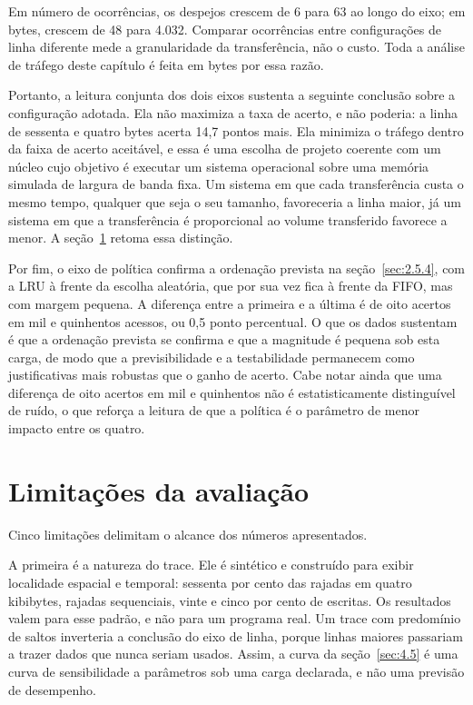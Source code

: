 Em número de ocorrências, os despejos crescem de 6 para 63 ao longo do eixo; em bytes, crescem de 48 para 4.032. Comparar ocorrências entre configurações de linha diferente mede a granularidade da transferência, não o custo. Toda a análise de tráfego deste capítulo é feita em bytes por essa razão.

Portanto, a leitura conjunta dos dois eixos sustenta a seguinte conclusão sobre a configuração adotada. Ela não maximiza a taxa de acerto, e não poderia: a linha de sessenta e quatro bytes acerta 14,7 pontos mais. Ela minimiza o tráfego dentro da faixa de acerto aceitável, e essa é uma escolha de projeto coerente com um núcleo cujo objetivo é executar um sistema operacional sobre uma memória simulada de largura de banda fixa. Um sistema em que cada transferência custa o mesmo tempo, qualquer que seja o seu tamanho, favoreceria a linha maior, já um sistema em que a transferência é proporcional ao volume transferido favorece a menor. A seção~\ref{sec:4.7} retoma essa distinção.

Por fim, o eixo de política confirma a ordenação prevista na seção~\ref{sec:2.5.4}, com a LRU à frente da escolha aleatória, que por sua vez fica à frente da FIFO, mas com margem pequena. A diferença entre a primeira e a última é de oito acertos em mil e quinhentos acessos, ou 0,5 ponto percentual. O que os dados sustentam é que a ordenação prevista se confirma e que a magnitude é pequena sob esta carga, de modo que a previsibilidade e a testabilidade permanecem como justificativas mais robustas que o ganho de acerto. Cabe notar ainda que uma diferença de oito acertos em mil e quinhentos não é estatisticamente distinguível de ruído, o que reforça a leitura de que a política é o parâmetro de menor impacto entre os quatro.

\section{Limitações da avaliação}\label{sec:4.7}

Cinco limitações delimitam o alcance dos números apresentados.

A primeira é a natureza do trace. Ele é sintético e construído para exibir localidade espacial e temporal: sessenta por cento das rajadas em quatro kibibytes, rajadas sequenciais, vinte e cinco por cento de escritas. Os resultados valem para esse padrão, e não para um programa real. Um trace com predomínio de saltos inverteria a conclusão do eixo de linha, porque linhas maiores passariam a trazer dados que nunca seriam usados. Assim, a curva da seção~\ref{sec:4.5} é uma curva de sensibilidade a parâmetros sob uma carga declarada, e não uma previsão de desempenho.

